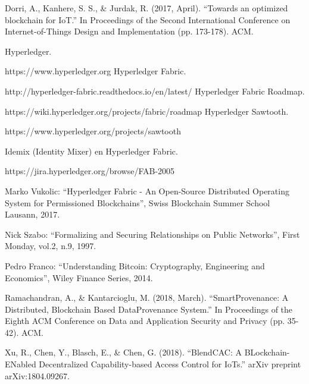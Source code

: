 \documentclass[10pt,conference,a4paper]{IEEEtran}
\begin{document}


\begin{thebibliography}{99}

Dorri, A., Kanhere, S. S., \& Jurdak, R. (2017, April). ``Towards an optimized blockchain for IoT.'' In Proceedings of the Second International Conference on Internet-of-Things Design and Implementation (pp. 173-178). ACM.

Hyperledger.

https://www.hyperledger.org
Hyperledger Fabric.

http://hyperledger-fabric.readthedocs.io/en/latest/
Hyperledger Fabric Roadmap.

https://wiki.hyperledger.org/projects/fabric/roadmap
Hyperledger Sawtooth.

https://www.hyperledger.org/projects/sawtooth

Idemix (Identity Mixer) en Hyperledger Fabric.

https://jira.hyperledger.org/browse/FAB-2005

Marko Vukolic: ``Hyperledger Fabric - An Open-Source Distributed Operating System for Permissioned Blockchains'', Swiss Blockchain Summer School Lausann, 2017.

Nick Szabo: ``Formalizing and Securing Relationships on Public Networks'', First Monday, vol.2, n.9, 1997.

Pedro Franco: ``Understanding Bitcoin: Cryptography, Engineering and Economics'', Wiley Finance Series, 2014.

Ramachandran, A., \& Kantarcioglu, M. (2018, March). ``SmartProvenance: A Distributed, Blockchain Based DataProvenance System.'' In Proceedings of the Eighth ACM Conference on Data and Application Security and Privacy (pp. 35-42). ACM.

Xu, R., Chen, Y., Blasch, E., \& Chen, G. (2018). ``BlendCAC: A BLockchain-ENabled Decentralized Capability-based Access Control for IoTs.'' arXiv preprint arXiv:1804.09267.

\end{thebibliography}
\end{document}
